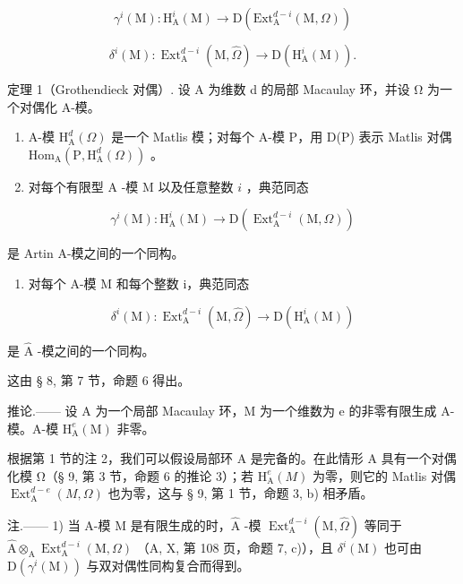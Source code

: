 \[
\gamma^ {i} (\mathrm{M}): \mathrm{H} _ {\mathrm{A}} ^ {i} (\mathrm{M}) \longrightarrow \mathrm{D} \left(\mathrm{Ext} _ {\mathrm{A}} ^ {d - i} (\mathrm{M}, \Omega)\right)
\]

\[
\delta^ {i} (\mathrm{M}): \operatorname{Ext} _ {\mathrm{A}} ^ {d - i} (\mathrm{M}, \widehat {\Omega}) \longrightarrow \mathrm{D} \left(\mathrm{H} _ {\mathrm{A}} ^ {i} (\mathrm{M})\right).
\]

定理 1（Grothendieck 对偶）. 设 A 为维数 d 的局部 Macaulay 环，并设 Ω 为一个对偶化 A-模。

\begin{enumerate}
\def\labelenumi{\alph{enumi})}
\item
  A-模 \(\mathrm{H}_{\mathrm{A}}^{d}(\Omega)\) 是一个 Matlis 模；对每个 A-模 P，用 D(P) 表示 Matlis 对偶 \(\mathrm{Hom}_{\mathrm{A}}(\mathrm{P},\mathrm{H}_{\mathrm{A}}^{d}(\Omega))\) 。
\item
  对每个有限型 \(\mathrm{A}\) -模 M 以及任意整数 \(i\) ，典范同态
\end{enumerate}

\[
\gamma^ {i} (\mathrm{M}): \mathrm{H} _ {\mathrm{A}} ^ {i} (\mathrm{M}) \longrightarrow \mathrm{D} \left(\operatorname{Ext} _ {\mathrm{A}} ^ {d - i} (\mathrm{M}, \Omega)\right)
\]

是 Artin A-模之间的一个同构。

\begin{enumerate}
\def\labelenumi{\alph{enumi})}
\setcounter{enumi}{2}
\tightlist
\item
  对每个 A-模 M 和每个整数 i，典范同态
\end{enumerate}

\[
\delta^ {i} (\mathrm{M}): \operatorname{Ext} _ {\mathrm{A}} ^ {d - i} (\mathrm{M}, \widehat {\Omega}) \longrightarrow \mathrm{D} \left(\mathrm{H} _ {\mathrm{A}} ^ {i} (\mathrm{M})\right)
\]

是 \(\widehat{\mathrm{A}}\) -模之间的一个同构。

这由 § 8, 第 7 节，命题 6 得出。

推论.—— 设 A 为一个局部 Macaulay 环，M 为一个维数为 e 的非零有限生成 A-模。A-模 \(\mathrm{H}_{\mathrm{A}}^{e}(\mathrm{M})\) 非零。

根据第 1 节的注 2，我们可以假设局部环 A 是完备的。在此情形 A 具有一个对偶化模 Ω（§ 9, 第 3 节，命题 6 的推论 3）；若 \(\mathrm{H}_{\mathrm{A}}^{e}(M)\) 为零，则它的 Matlis 对偶 \(\operatorname{Ext}_{\mathrm{A}}^{d-e}(M, \Omega)\) 也为零，这与 § 9, 第 1 节，命题 3, b) 相矛盾。

注.—— 1) 当 A-模 M 是有限生成的时，\(\widehat{\mathrm{A}}\) -模 \(\operatorname{Ext}_{\mathrm{A}}^{d-i}(\mathrm{M}, \widehat{\Omega})\) 等同于 \(\widehat{\mathrm{A}} \otimes_{\mathrm{A}} \operatorname{Ext}_{\mathrm{A}}^{d-i}(\mathrm{M}, \Omega)\) （A, X, 第 108 页，命题 7, c)），且 \(\delta^{i}(\mathrm{M})\) 也可由 \(\mathrm{D}(\gamma^{i}(\mathrm{M}))\) 与双对偶性同构复合而得到。

